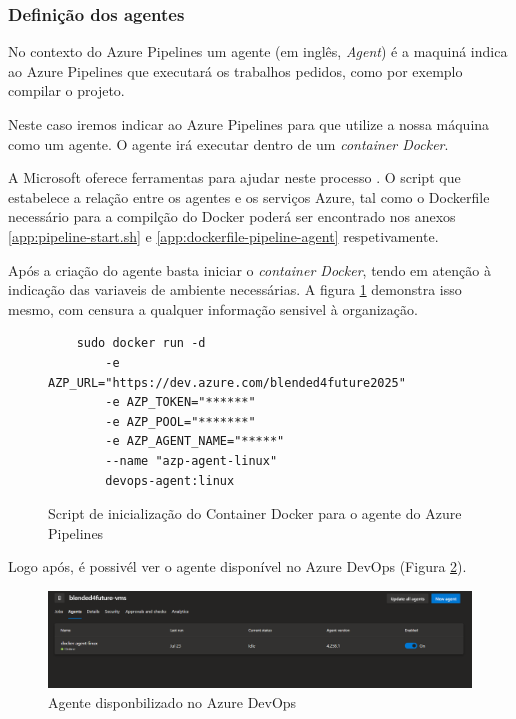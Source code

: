 \subsubsection{Definição dos agentes}

No contexto do Azure Pipelines um agente (em inglês, \textit{Agent}) é a maquiná indica ao Azure Pipelines que executará os trabalhos pedidos, como por exemplo compilar o projeto. 

Neste caso iremos indicar ao Azure Pipelines para que utilize a nossa máquina como um agente. O agente irá executar dentro de um \textit{container Docker}.

A Microsoft oferece ferramentas para ajudar neste processo \cite{run-a-self-hosted-agent-in-docker}. O script que estabelece a relação entre os agentes e os serviços Azure, tal como o Dockerfile necessário para a compilção do Docker poderá ser encontrado nos anexos \ref{app:pipeline-start.sh} e \ref{app:dockerfile-pipeline-agent} respetivamente.

Após a criação do agente basta iniciar o \textit{container Docker}, tendo em atenção à indicação das variaveis de ambiente necessárias. A figura \ref{fig:start-docker-agent} demonstra isso mesmo, com censura a qualquer informação sensivel à organização.

\begin{figure}
    

\begin{lstlisting}
    sudo docker run -d 
        -e AZP_URL="https://dev.azure.com/blended4future2025" 
        -e AZP_TOKEN="******" 
        -e AZP_POOL="*******" 
        -e AZP_AGENT_NAME="*****" 
        --name "azp-agent-linux" 
        devops-agent:linux
\end{lstlisting}


\caption{Script de inicialização do Container Docker para o agente do Azure Pipelines}
\label{fig:start-docker-agent}

\end{figure}

Logo após, é possivél ver o agente disponível no Azure DevOps (Figura \ref{fig:agent-devops}). 

\begin{figure}
\includegraphics[width=\linewidth]{capitulos/cap4-implementacao/assets/devops-agent.png}
\caption{Agente disponbilizado no Azure DevOps}
\label{fig:agent-devops}
\end{figure}

